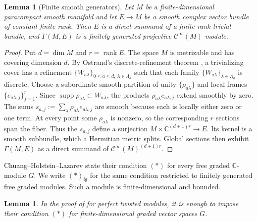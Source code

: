 \documentclass[12pt]{amsart}
\newtheorem{lem}[thm]{Lemma}
\theoremstyle{definition}
\theoremstyle{remark}
\numberwithin{equation}{section}
\newcommand{\C}{\mathbb C}
\newcommand{\cinf}{\mathcal C^\infty}
\begin{document}
\begin{lem}[Finite smooth generators]
\label{lem:finite-smooth-generators}
Let \(M\) be a finite-dimensional paracompact smooth manifold and let
\(E\to M\) be a smooth complex vector bundle of constant finite rank.  Then
\(E\) is a direct summand of a finite-rank trivial bundle, and
\(\Gamma(M,E)\) is a finitely generated projective
\(\cinf(M)\)-module.
\end{lem}

\begin{proof}
Put \(d=\dim M\) and \(r=\operatorname{rank}E\).  The space \(M\) is
metrizable and has covering dimension \(d\).  By Ostrand's discrete-refinement
theorem \cite[Theorem~1]{Ostrand1965}, a trivializing cover has a refinement
\(\{W_{a\lambda}\}_{0\leq a\leq d,\ \lambda\in\Lambda_a}\)
such that each family \(\{W_{a\lambda}\}_{\lambda\in\Lambda_a}\) is
discrete.  Choose a subordinate smooth partition of unity
\(\{\rho_{a\lambda}\}\) and local frames
\(\{e_{a\lambda,j}\}_{j=1}^r\).  Since
\(\operatorname{supp}\rho_{a\lambda}\subset W_{a\lambda}\), the products
\(\rho_{a\lambda}e_{a\lambda,j}\) extend smoothly by zero.  The sums
\(s_{a,j}:=\sum_\lambda\rho_{a\lambda}e_{a\lambda,j}\) are smooth because
each is locally either zero or one term.  At every point some
\(\rho_{a\lambda}\) is nonzero, so the corresponding \(r\) sections span
the fiber.  Thus the \(s_{a,j}\) define a surjection
\(M\times\C^{(d+1)r}\to E\).  Its kernel is a smooth subbundle, which a
Hermitian metric splits.  Global sections then exhibit \(\Gamma(M,E)\) as a
direct summand of \(\cinf(M)^{(d+1)r}\).
\end{proof}

Chuang--Holstein--Lazarev state their condition \({(*)}\) for every free
graded \(\C\)-module \(G\).  We write \({(*)}_{\mathrm{fg}}\) for the same
condition restricted to finitely generated free graded modules.  Such a
module is finite-dimensional and bounded.

\begin{lem}\label{lem:finite-condition}
In the proof of \cite[Proposition~7.4 and Theorem~7.10]{CHL2021} for
perfect twisted modules, it is enough to impose their condition \({(*)}\)
for finite-dimensional graded vector spaces \(G\).
\end{lem}
\end{document}
